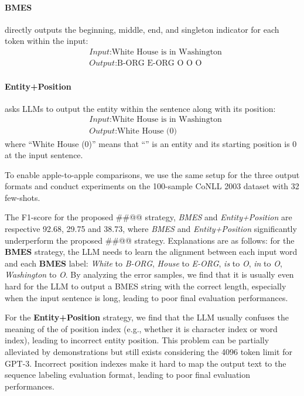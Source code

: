 \documentclass[11pt]{article}
\begin{document}
\paragraph{BMES} directly outputs the beginning, middle, end, and singleton indicator for each token within the input:
\begin{equation}
\nonumber
    \begin{aligned}
    	&\textit{Input}\text{:White House is in Washington}\\
    	&\textit{Output}\text{:B-ORG E-ORG O O O}
    \end{aligned}
\end{equation}
\paragraph{Entity+Position} asks LLMs to output the entity within the sentence along with its position: 
\begin{equation}
\nonumber
    \begin{aligned}
    	&\textit{Input}\text{:White House is in Washington}\\
    	&\textit{Output}\text{:White House (0)}
    \end{aligned}
\end{equation}
where “White House (0)” means that “”  is an entity and its starting position is 0 at the input sentence.

To enable apple-to-apple comparisons, 
we use the same setup for the three output formats and conduct experiments on the 100-sample CoNLL 2003 dataset with 32 few-shots. 

The F1-score for the proposed \#\#@@ strategy, {\it BMES} and {\it Entity+Position} are respective 92.68, 29.75 and 38.73, where  {\it BMES} and {\it Entity+Position} 
 significantly  underperform the proposed \#\#@@ strategy. 
 Explanations are as follows: 
 for the \textbf{BMES} strategy, the LLM needs to learn the alignment between each input word and each \textbf{BMES} label: \textit{White} to \textit{B-ORG}, \textit{House} to \textit{E-ORG}, \textit{is} to \textit{O}, \textit{in} to \textit{O}, \textit{Washington} to \textit{O}. By analyzing the error samples, we find that it is usually even hard for the LLM to output a BMES string with the correct length, especially when the input sentence is long, leading to poor final evaluation performances. 

For the \textbf{Entity+Position} strategy, we find that the LLM usually confuses the meaning of the of position index (e.g., whether it is character index or word index), leading to incorrect entity position. This problem can be partially alleviated by demonstrations but still exists considering the 4096 token limit for GPT-3. 
Incorrect position indexes make it hard to map the output text to the sequence labeling evaluation format, leading to poor final evaluation performances. 
\end{document}
